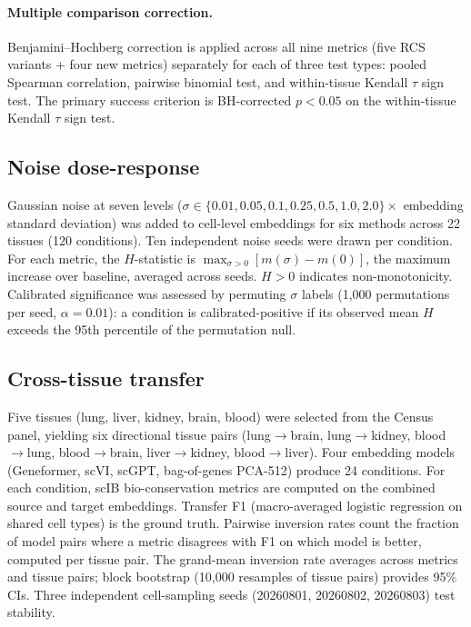 \documentclass[11pt]{article}
\begin{document}
\paragraph{Multiple comparison correction.} Benjamini--Hochberg
correction is applied across all nine metrics (five RCS variants + four
new metrics) separately for each of three test types: pooled Spearman
correlation, pairwise binomial test, and within-tissue Kendall $\tau$
sign test. The primary success criterion is BH-corrected $p < 0.05$ on
the within-tissue Kendall $\tau$ sign test.

\subsection{Noise dose-response}
\label{sec:noisemethod}

Gaussian noise at seven levels ($\sigma \in \{0.01, 0.05, 0.1, 0.25,
0.5, 1.0, 2.0\} \times$ embedding standard deviation) was added to
cell-level embeddings for six methods across 22 tissues (120
conditions). Ten independent noise seeds were drawn per condition. For
each metric, the $H$-statistic is $\max_{\sigma > 0}[m(\sigma) -
m(0)]$, the maximum increase over baseline, averaged across seeds.
$H > 0$ indicates non-monotonicity. Calibrated significance
was assessed by permuting $\sigma$ labels (1{,}000 permutations per
seed, $\alpha = 0.01$): a condition is calibrated-positive if its
observed mean $H$ exceeds the 95th percentile of the permutation null.

\subsection{Cross-tissue transfer}
\label{sec:crosstissuemethod}

Five tissues (lung, liver, kidney, brain, blood) were selected from the
Census panel, yielding six directional tissue pairs (lung$\to$brain,
lung$\to$kidney, blood$\to$lung, blood$\to$brain, liver$\to$kidney,
blood$\to$liver). Four embedding models (Geneformer, scVI, scGPT,
bag-of-genes PCA-512) produce 24 conditions. For each condition, scIB
bio-conservation metrics are computed on the combined source and target
embeddings. Transfer F1 (macro-averaged logistic regression on shared
cell types) is the ground truth. Pairwise inversion rates count the
fraction of model pairs where a metric disagrees with F1 on which model
is better, computed per tissue pair. The grand-mean inversion rate
averages across metrics and tissue pairs; block bootstrap (10,000
resamples of tissue pairs) provides 95\% CIs. Three independent
cell-sampling seeds (20260801, 20260802, 20260803) test stability.
\end{document}
